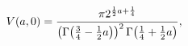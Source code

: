 \[\mathop{V\/}\nolimits\!\left(a,0\right)=\frac{\pi 2^{\frac{1}{2}a+\frac{1}{4}}%
}{\left(\mathop{\Gamma\/}\nolimits\!\left(\frac{3}{4}-\frac{1}{2}a\right)%
\right)^{2}\mathop{\Gamma\/}\nolimits\!\left(\frac{1}{4}+\frac{1}{2}a\right)},\]